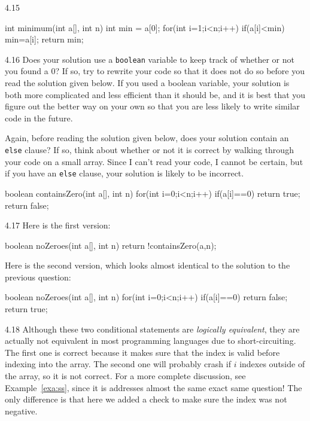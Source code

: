 \begin{RequAnswer}{4.15}
\begin{code}
int minimum(int a[], int n) {
    int min = a[0];
    for(int i=1;i<n;i++) {
        if(a[i]<min) {
            min=a[i];
        }
    }
    return min;
}
\end{code}
\end{RequAnswer}
\begin{RequAnswer}{4.16}
Does your solution use a \verb+boolean+ variable to keep track of whether or not you found a 0?
If so, try to rewrite your code so that it does not do so before you read the solution given below.
If you used a boolean variable, your solution is both more complicated and less efficient than it should be,
and it is best that you figure out the better way on your own so that you are less likely to write similar
code in the future.

Again, before reading the solution given below, does your solution contain an \verb+else+ clause?
If so, think about whether or not it is correct by walking through your code on a small array.
Since I can't read your code, I cannot be certain, but if you have an \verb+else+ clause,
your solution is likely to be incorrect.
\begin{code}
boolean containsZero(int a[], int n) {
    for(int i=0;i<n;i++) {
        if(a[i]==0) {
            return true;
        }
    }
    return false;
}
\end{code}
\end{RequAnswer}
\begin{RequAnswer}{4.17}
Here is the first version:
\begin{code}
boolean noZeroes(int a[], int n) {
    return !containsZero(a,n);
}
\end{code}
Here is the second version, which looks almost identical to the solution to the previous question:
\begin{code}
boolean noZeroes(int a[], int n) {
    for(int i=0;i<n;i++) {
        if(a[i]==0) {
            return false;
        }
    }
    return true;
}
\end{code}
\end{RequAnswer}
\begin{RequAnswer}{4.18}
Although these two conditional statements are
{\em logically equivalent}, they are actually not equivalent
in most programming languages due to short-circuiting.
The first one is correct because it makes sure
that the index is valid before indexing into the array.
The second one will probably crash if $i$ indexes outside of the array, so it is not correct.
For a more complete discussion, see Example~\ref{exa:ss}, since
it is addresses almost the same exact same question!
The only difference is that here we added a check to make sure the
index was not negative.
\end{RequAnswer}

